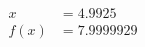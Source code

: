\documentclass[preview]{standalone}
\begin{document}
\begin{align*}
x &= 4.9925\\f(x) &= 7.9999929
\end{align*}
\end{document}
